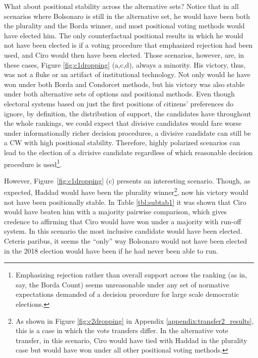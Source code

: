 \documentclass[hidelinks,11pt]{article}
\begin{document}
What about positional stability across the alternative sets? Notice that in all scenarios where Bolsonaro is still in the alternative set, he would have been both the plurality and the Borda winner, and most positional voting methods would have elected him. The only counterfactual positional results in which he would not have been elected is if a voting procedure that emphasized rejection had been used, and Ciro would then have been elected. Those scenarios, however, are, in these cases, Figure \ref{fig:c1dropping} (a,c,d), always a minority. His victory, thus, was not a fluke or an artifact of institutional technology. Not only would he have won under both Borda and Condorcet methods, but his victory was also stable under both alternative sets of options and positional methods. Even though electoral systems based on just the first positions of citizens' preferences do ignore, by definition, the distribution of support, the candidates have throughout the whole rankings, we could expect that divisive candidates would fare worse under informationally richer decision procedures, a divisive candidate can still be a CW with high positional stability. Therefore, highly polarized scenarios can lead to the election of a divisive candidate regardless of which reasonable decision procedure is used\footnote{Emphasizing rejection rather than overall support across the ranking (as in, say, the Borda Count) seems unreasonable under any set of normative expectations demanded of a decision procedure for large scale democratic elections.}.


However, Figure~\ref{fig:c1dropping} (c) presents an interesting scenario.
Though, as expected, Haddad would have been the plurality winner\footnote{As
  shown in Figure \ref{fig:c2dropping} in Appendix
  \ref{appendix:transfer2_results}, this is a case in which the vote transfers
  differ. In the alternative vote transfer, in this scenario, Ciro would have
  tied with Haddad in the plurality case but would have won under all other
  positional voting methods.}, now his victory would not have been positionally
stable. In Table \ref{tbl:subtab1} it was shown that Ciro would have
beaten him with a majority pairwise comparison, which gives credence to affirming
that Ciro would have won under a majority with run-off system. In this scenario
the most inclusive candidate would have been elected. Ceteris paribus, it seems the ``only'' way Bolsonaro would not have been elected in the 2018 election would have been if he had never been able to run.

\end{document}

